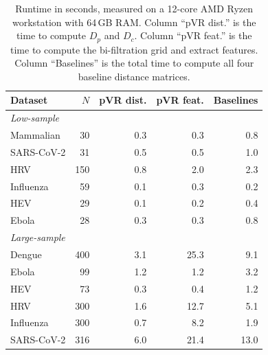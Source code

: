 \begin{table}[t]
\centering
\footnotesize
\caption{Runtime in seconds, measured on a 12-core AMD Ryzen workstation with 64\,GB RAM. Column ``pVR dist.'' is the time to compute $D_p$ and $D_c$. Column ``pVR feat.'' is the time to compute the bi-filtration grid and extract features. Column ``Baselines'' is the total time to compute all four baseline distance matrices.}
\label{tab:runtime}
\begin{tabular}{lrrrr}
\hline
Dataset & $N$ & pVR dist. & pVR feat. & Baselines \\
\hline
\multicolumn{5}{l}{\textit{Low-sample}} \\
Mammalian & 30 & 0.3 & 0.3 & 0.8 \\
SARS-CoV-2 & 31 & 0.5 & 0.5 & 1.0 \\
HRV & 150 & 0.8 & 2.0 & 2.3 \\
Influenza & 59 & 0.1 & 0.3 & 0.2 \\
HEV & 29 & 0.1 & 0.2 & 0.4 \\
Ebola & 28 & 0.3 & 0.3 & 0.8 \\
\hline
\multicolumn{5}{l}{\textit{Large-sample}} \\
Dengue & 400 & 3.1 & 25.3 & 9.1 \\
Ebola & 99 & 1.2 & 1.2 & 3.2 \\
HEV & 73 & 0.3 & 0.4 & 1.2 \\
HRV & 300 & 1.6 & 12.7 & 5.1 \\
Influenza & 300 & 0.7 & 8.2 & 1.9 \\
SARS-CoV-2 & 316 & 6.0 & 21.4 & 13.0 \\
\hline
\end{tabular}
\end{table}
